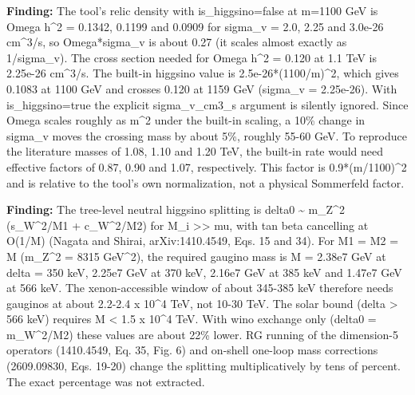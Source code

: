\documentclass[11pt,a4paper]{article}
\begin{document}
\textbf{Finding:} The tool's relic density with is\_higgsino=false at m=1100 GeV is Omega h\textasciicircum{}2 = 0.1342, 0.1199 and 0.0909 for sigma\_v = 2.0, 2.25 and 3.0e-26 cm\textasciicircum{}3/s, so Omega*sigma\_v is about 0.27 (it scales almost exactly as 1/sigma\_v). The cross section needed for Omega h\textasciicircum{}2 = 0.120 at 1.1 TeV is 2.25e-26 cm\textasciicircum{}3/s. The built-in higgsino value is 2.5e-26*(1100/m)\textasciicircum{}2, which gives 0.1083 at 1100 GeV and crosses 0.120 at 1159 GeV (sigma\_v = 2.25e-26). With is\_higgsino=true the explicit sigma\_v\_cm3\_s argument is silently ignored. Since Omega scales roughly as m\textasciicircum{}2 under the built-in scaling, a 10\% change in sigma\_v moves the crossing mass by about 5\%, roughly 55-60 GeV. To reproduce the literature masses of 1.08, 1.10 and 1.20 TeV, the built-in rate would need effective factors of 0.87, 0.90 and 1.07, respectively. This factor is 0.9*(m/1100)\textasciicircum{}2 and is relative to the tool's own normalization, not a physical Sommerfeld factor.

\textbf{Finding:} The tree-level neutral higgsino splitting is delta0 \textasciitilde{} m\_Z\textasciicircum{}2 (s\_W\textasciicircum{}2/M1 + c\_W\textasciicircum{}2/M2) for M\_i \textgreater{}\textgreater{} \textbar{}mu\textbar{}, with tan beta cancelling at O(1/M) (Nagata and Shirai, arXiv:1410.4549, Eqs. 15 and 34). For M1 = M2 = M (m\_Z\textasciicircum{}2 = 8315 GeV\textasciicircum{}2), the required gaugino mass is M = 2.38e7 GeV at delta = 350 keV, 2.25e7 GeV at 370 keV, 2.16e7 GeV at 385 keV and 1.47e7 GeV at 566 keV. The xenon-accessible window of about 345-385 keV therefore needs gauginos at about 2.2-2.4 x 10\textasciicircum{}4 TeV, not 10-30 TeV. The solar bound (delta \textgreater{} 566 keV) requires M \textless{} 1.5 x 10\textasciicircum{}4 TeV. With wino exchange only (delta0 = m\_W\textasciicircum{}2/M2) these values are about 22\% lower. RG running of the dimension-5 operators (1410.4549, Eq. 35, Fig. 6) and on-shell one-loop mass corrections (2609.09830, Eqs. 19-20) change the splitting multiplicatively by tens of percent. The exact percentage was not extracted.
\end{document}
